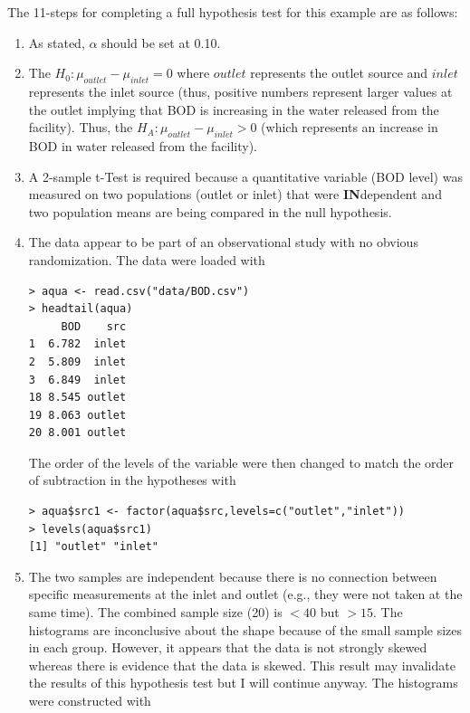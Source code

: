 \documentclass[10pt,openany]{book}\usepackage[]{graphicx}\usepackage[]{color}
\makeatletter
\newenvironment{kframe}{%
 \def\at@end@of@kframe{}%
 \ifinner\ifhmode%
  \def\at@end@of@kframe{\end{minipage}}%
  \begin{minipage}{\columnwidth}%
 \fi\fi%
 \def\FrameCommand##1{\hskip\@totalleftmargin \hskip-\fboxsep
 \colorbox{shadecolor}{##1}\hskip-\fboxsep
     \hskip-\linewidth \hskip-\@totalleftmargin \hskip\columnwidth}%
 \MakeFramed {\advance\hsize-\width
   \@totalleftmargin\z@ \linewidth\hsize
   \@setminipage}}%
 {\par\unskip\endMakeFramed%
 \at@end@of@kframe}
\newenvironment{knitrout}{}{} %
\makeatother
\begin{document}
The 11-steps  for completing a full hypothesis test for this example are as follows:
  \begin{enumerate}
    \item As stated, $\alpha$ should be set at 0.10.
    \item The $H_{0}:\mu_{outlet}-\mu_{inlet}=0$ where $outlet$ represents the outlet source and $inlet$ represents the inlet source (thus, positive numbers represent larger values at the outlet implying that BOD is increasing in the water released from the facility).  Thus, the $H_{A}:\mu_{outlet}-\mu_{inlet}>0$ (which represents an increase in BOD in water released from the facility).
    \item A 2-sample t-Test is required because a quantitative variable (BOD level) was measured on two populations (outlet or inlet) that were \textbf{IN}dependent and two population means are being compared in the null hypothesis.
    \item The data appear to be part of an observational study with no obvious randomization.  The data were loaded with
\begin{knitrout}
\color{fgcolor}\begin{kframe}
\begin{verbatim}
> aqua <- read.csv("data/BOD.csv")
> headtail(aqua)
     BOD    src
1  6.782  inlet
2  5.809  inlet
3  6.849  inlet
18 8.545 outlet
19 8.063 outlet
20 8.001 outlet
\end{verbatim}
\end{kframe}
\end{knitrout}
The order of the levels of the  variable were then changed to match the order of subtraction in the hypotheses with
\begin{knitrout}
\color{fgcolor}\begin{kframe}
\begin{verbatim}
> aqua$src1 <- factor(aqua$src,levels=c("outlet","inlet"))
> levels(aqua$src1)
[1] "outlet" "inlet" 
\end{verbatim}
\end{kframe}
\end{knitrout}
    \item The two samples are independent because there is no connection between specific measurements at the inlet and outlet (e.g., they were not taken at the same time). The combined sample size (20) is $<40$ but $>15$.  The histograms  are inconclusive about the shape because of the small sample sizes in each group.  However, it appears that the  data is not strongly skewed whereas there is evidence that the  data is skewed.  This result may invalidate the results of this hypothesis test but I will continue anyway.  The histograms were constructed with

\end{enumerate}
\end{document}
